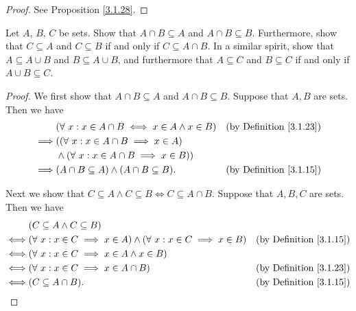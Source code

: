 \begin{proof}
    See Proposition \ref{3.1.28}.
\end{proof}

\begin{exercise}\label{ex 3.1.7}
    Let \(A\), \(B\), \(C\) be sets.
    Show that \(A \cap B \subseteq A\) and \(A \cap B \subseteq B\).
    Furthermore, show that \(C \subseteq A\) and \(C \subseteq B\) if and only if \(C \subseteq A \cap B\).
    In a similar spirit, show that \(A \subseteq A \cup B\) and \(B \subseteq A \cup B\), and furthermore that \(A \subseteq C\) and \(B \subseteq C\) if and only if \(A \cup B \subseteq C\).
\end{exercise}

\begin{proof}
    We first show that \(A \cap B \subseteq A\) and \(A \cap B \subseteq B\).
    Suppose that \(A, B\) are sets.
    Then we have
    \begin{align*}
                 & (\forall\ x : x \in A \cap B \iff x \in A \land x \in B) & \text{(by Definition \ref{3.1.23})} \\
        \implies & ((\forall\ x : x \in A \cap B \implies x \in A)                                                \\
                 & \land (\forall\ x : x \in A \cap B \implies x \in B))                                          \\
        \implies & (A \cap B \subseteq A) \land (A \cap B \subseteq B).     & \text{(by Definition \ref{3.1.15})}
    \end{align*}

    Next we show that \(C \subseteq A \land C \subseteq B \iff C \subseteq A \cap B\).
    Suppose that \(A, B, C\) are sets.
    Then we have
    \begin{align*}
             & (C \subseteq A \land C \subseteq B)                                                                                         \\
        \iff & (\forall\ x : x \in C \implies x \in A) \land (\forall\ x : x \in C \implies x \in B) & \text{(by Definition \ref{3.1.15})} \\
        \iff & (\forall\ x : x \in C \implies x \in A \land x \in B)                                                                       \\
        \iff & (\forall\ x : x \in C \implies x \in A \cap B)                                        & \text{(by Definition \ref{3.1.23})} \\
        \iff & (C \subseteq A \cap B).                                                               & \text{(by Definition \ref{3.1.15})}
    \end{align*}


\end{proof}
